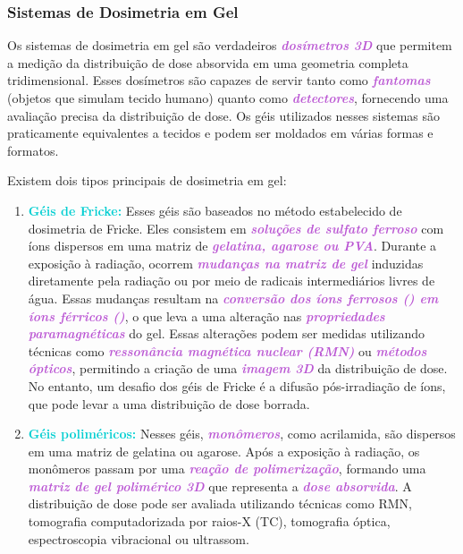 \documentclass[11pt,a4paper]{article}
\begin{document}
\subsubsection*{Sistemas de Dosimetria em Gel}

	Os sistemas de dosimetria em gel são verdadeiros \textcolor{MediumOrchid}{\textit{\textbf{dosímetros 3D}}} que permitem a medição da distribuição de dose absorvida em uma geometria completa tridimensional. Esses dosímetros são capazes de servir tanto como \textcolor{MediumOrchid}{\textit{\textbf{fantomas}}} (objetos que simulam tecido humano) quanto como \textcolor{MediumOrchid}{\textit{\textbf{detectores}}}, fornecendo uma avaliação precisa da distribuição de dose. Os géis utilizados nesses sistemas são praticamente equivalentes a tecidos e podem ser moldados em várias formas e formatos.

	Existem dois tipos principais de dosimetria em gel:

	\begin{enumerate}
		\item \textcolor{DarkTurquoise}{\textbf{Géis de Fricke:}} Esses géis são baseados no método estabelecido de dosimetria de Fricke. Eles consistem em \textcolor{MediumOrchid}{\textit{\textbf{soluções de sulfato ferroso}}} com íons  dispersos em uma matriz de \textcolor{MediumOrchid}{\textit{\textbf{gelatina, agarose ou PVA}}}. Durante a exposição à radiação, ocorrem \textcolor{MediumOrchid}{\textit{\textbf{mudanças na matriz de gel}}} induzidas diretamente pela radiação ou por meio de radicais intermediários livres de água. Essas mudanças resultam na \textcolor{MediumOrchid}{\textit{\textbf{conversão dos íons ferrosos () em íons férricos ()}}}, o que leva a uma alteração nas \textcolor{MediumOrchid}{\textit{\textbf{propriedades paramagnéticas}}} do gel. Essas alterações podem ser medidas utilizando técnicas como \textcolor{MediumOrchid}{\textit{\textbf{ressonância magnética nuclear (RMN)}}} ou \textcolor{MediumOrchid}{\textit{\textbf{métodos ópticos}}}, permitindo a criação de uma \textcolor{MediumOrchid}{\textit{\textbf{imagem 3D}}} da distribuição de dose. No entanto, um desafio dos géis de Fricke é a difusão pós-irradiação de íons, que pode levar a uma distribuição de dose borrada.

		\item \textcolor{DarkTurquoise}{\textbf{Géis poliméricos:}} Nesses géis, \textcolor{MediumOrchid}{\textit{\textbf{monômeros}}}, como acrilamida, são dispersos em uma matriz de gelatina ou agarose. Após a exposição à radiação, os monômeros passam por uma \textcolor{MediumOrchid}{\textit{\textbf{reação de polimerização}}}, formando uma \textcolor{MediumOrchid}{\textit{\textbf{matriz de gel polimérico 3D}}} que representa a \textcolor{MediumOrchid}{\textit{\textbf{dose absorvida}}}. A distribuição de dose pode ser avaliada utilizando técnicas como RMN, tomografia computadorizada por raios-X (TC), tomografia óptica, espectroscopia vibracional ou ultrassom.
	\end{enumerate}
\end{document}
